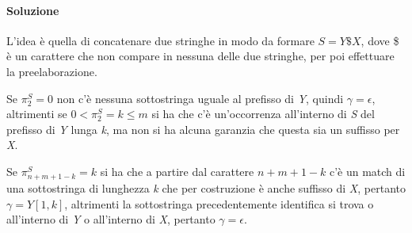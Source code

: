 \paragraph{Soluzione}

L'idea è quella di concatenare due stringhe in modo da formare $ S= Y\$X $, dove \$ è un carattere che non compare in nessuna delle due stringhe, per poi effettuare la preelaborazione.

Se $ \pi_2^S = 0$ non c'è nessuna sottostringa uguale al prefisso di \textit{Y}, quindi $ \gamma = \epsilon $, altrimenti se  $ 0 < \pi_2^S = k \leq m$ si ha che c'è un'occorrenza all'interno di \textit{S} del prefisso di \textit{Y} lunga \textit{k}, ma non si ha alcuna garanzia che questa sia un suffisso per \textit{X}.

Se  $ \pi_{n+m+1-k}^S = k$ si ha che a partire dal carattere $ n+m+1-k $ c'è un match di una sottostringa di lunghezza \textit{k} che per costruzione è anche suffisso di \textit{X}, pertanto $ \gamma = Y[1,k] $, altrimenti la sottostringa precedentemente identifica si trova o all'interno di \textit{Y} o all'interno di \textit{X}, pertanto $ \gamma = \epsilon $.

